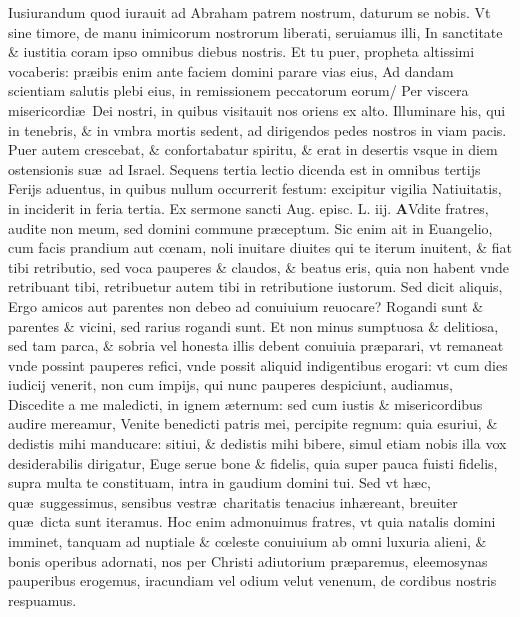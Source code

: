 \documentclass[a5paper,10pt]{book}
\def\ae{æ}
\def\oe{œ}
\begin{document}
\begin{multicols*}{2}
Iusiurandum quod iurauit ad Abraham patrem nostrum, daturum se nobis.
Vt sine timore, de manu inimicorum nostrorum liberati, seruiamus illi, In sanctitate \& iustitia coram ipso omnibus diebus nostris.
Et tu puer, propheta altissimi vocaberis: pr\ae ibis enim ante faciem domini parare vias eius, Ad dandam scientiam salutis plebi eius, in remissionem peccatorum eorum/
Per viscera misericordi\ae \ Dei nostri, in quibus visitauit nos oriens ex alto.
Illuminare his, qui in tenebris, \& in vmbra mortis sedent, ad dirigendos pedes nostros in viam pacis.
Puer autem crescebat, \& confortabatur spiritu, \& erat in desertis vsque in diem ostensionis su\ae \ ad Israel.
\newline {} \color{red} Sequens tertia lectio dicenda est in omnibus tertijs Ferijs aduentus, in quibus nullum occurrerit festum: excipitur vigilia Natiuitatis, in inciderit in feria tertia. \color{black}
\newline \color{red} Ex sermone sancti Aug. episc. L. iij. \color{black}
\vspace{-.25em}
\lettrine[lines=2]{\bfseries \color{red} A}{}Vdite fratres, audite non meum, sed domini commune pr\ae ceptum.
Sic enim ait in Euangelio, cum facis prandium aut c\oe nam, noli inuitare diuites qui te iterum inuitent, \& fiat tibi retributio, sed voca pauperes \& claudos, \& beatus eris, quia non habent vnde retribuant tibi, retribuetur autem tibi in retributione iustorum.
Sed dicit aliquis, Ergo amicos aut parentes non debeo ad conuiuium reuocare?
Rogandi sunt \& parentes \& vicini, sed rarius rogandi sunt.
Et non minus sumptuosa \& delitiosa, sed tam parca, \& sobria vel honesta illis debent conuiuia pr\ae parari, vt remaneat vnde possint pauperes refici, vnde possit aliquid indigentibus erogari: vt cum dies iudicij venerit, non cum impijs, qui nunc pauperes despiciunt, audiamus, Discedite a me maledicti, in ignem \ae ternum: sed cum iustis \& misericordibus audire mereamur, Venite benedicti patris mei, percipite regnum: quia esuriui, \& dedistis mihi manducare: sitiui, \& dedistis mihi bibere, simul etiam nobis illa vox desiderabilis dirigatur, Euge serue bone \& fidelis, quia super pauca fuisti fidelis, supra multa te constituam, intra in gaudium domini tui.
Sed vt h\ae c, qu\ae \ suggessimus, sensibus vestr\ae \ charitatis tenacius inh\ae reant, breuiter qu\ae \ dicta sunt iteramus.
Hoc enim admonuimus fratres, vt quia natalis domini imminet, tanquam ad nuptiale \& c\oe leste conuiuium ab omni luxuria alieni, \& bonis operibus adornati, nos per Christi adiutorium pr\ae paremus, eleemosynas pauperibus erogemus, iracundiam vel odium velut venenum, de cordibus nostris respuamus.

\end{multicols*}
\end{document}
